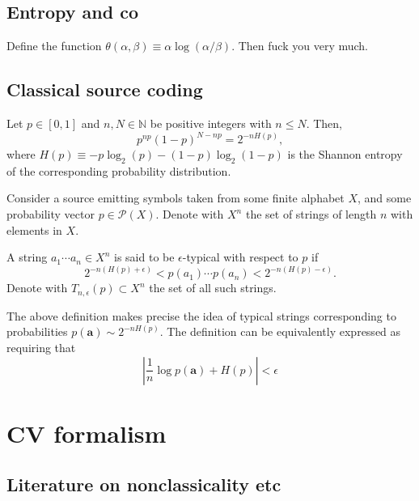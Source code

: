 \documentclass[12pt]{report}
\newcommand{\NN}{\mathbb{N}}
\newcommand{\bs}[1]{\boldsymbol{#1}}
\newcommand{\calP}{{\mathcal{P}}}
\begin{document}
\section{Entropy and co}

Define the function $\theta(\alpha,\beta)\equiv \alpha\log(\alpha/\beta)$. Then fuck you very much.

\section{Classical source coding}

\begin{prop}
	Let $p\in[0,1]$ and $n,N\in\NN$ be positive integers with $n\le N$.
	Then,
	\begin{equation}
		p^{np} (1-p)^{N-np}
		= 2^{-nH(p)},
	\end{equation}
	where $H(p)\equiv -p\log_2(p)-(1-p)\log_2(1-p)$ is the Shannon entropy of the corresponding probability distribution.
\end{prop}

Consider a source emitting symbols taken from some finite alphabet $X$, and some probability vector $p\in \calP(X)$.
Denote with $X^n$ the set of strings of length $n$ with elements in $X$.

\begin{defn}
	A string $a_1\cdots a_n\in X^n$ is said to be $\epsilon$-typical with respect to $p$ if
	\begin{equation}
		2^{-n(H(p)+\epsilon)} < p(a_1)\cdots p(a_n) < 2^{-n(H(p)-\epsilon)}.
	\end{equation}
	Denote with $T_{n,\epsilon}(p)\subset X^n$ the set of all such strings.
\end{defn}

The above definition makes precise the idea of typical strings corresponding to probabilities $p(\bs a)\sim 2^{-nH(p)}$.
The definition can be equivalently expressed as requiring that
\begin{equation}
	\left\lvert \frac{1}{n}\log p(\bs a) + H(p) \right\rvert < \epsilon
\end{equation}

\chapter{CV formalism}
\minitoc

\section{Literature on nonclassicality etc}
\end{document}
